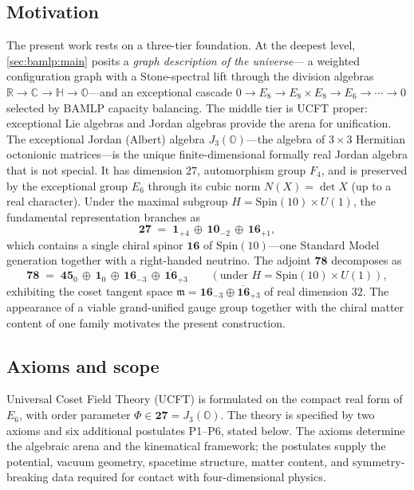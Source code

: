 \documentclass[11pt]{article}
\theoremstyle{plain}
\theoremstyle{definition}
\theoremstyle{remark}
\begin{document}
\subsection{Motivation}
\label{sec:intro:motivation}

The present work rests on a three-tier foundation. At the deepest level,
\autoref{sec:bamlp:main} posits a \emph{graph description of the universe}---
a weighted configuration graph with a Stone-spectral lift through the division
algebras $\mathbb{R}\to\mathbb{C}\to\mathbb{H}\to\mathbb{O}$---and an
exceptional cascade $0\to E_8\to E_8\times E_8\to E_6\to\cdots\to 0$ selected
by BAMLP capacity balancing. The middle tier is UCFT proper: exceptional Lie
algebras and Jordan algebras provide the arena for unification. The exceptional Jordan (Albert) algebra
$J_{3}(\mathbb{O})$---the algebra of $3\times 3$ Hermitian octonionic
matrices---is the unique finite-dimensional formally real Jordan algebra that is
not special. It has dimension $27$, automorphism group $F_4$, and is preserved
by the exceptional group $E_6$ through its cubic norm $N(X)=\det X$ (up to a
real character). Under the maximal subgroup $H=\mathrm{Spin}(10)\times U(1)$,
the fundamental representation branches as
\begin{equation}
  \mathbf{27} \;=\; \mathbf{1}_{+4}\,\oplus\,\mathbf{10}_{-2}\,\oplus\,\mathbf{16}_{+1},
  \label{eq:intro:27branch}
\end{equation}
which contains a single chiral spinor $\mathbf{16}$ of $\mathrm{Spin}(10)$---one
Standard Model generation together with a right-handed neutrino. The adjoint
$\mathbf{78}$ decomposes as
\begin{equation}
  \mathbf{78} \;=\; \mathbf{45}_{0}\,\oplus\,\mathbf{1}_{0}\,\oplus\,
  \mathbf{16}_{-3}\,\oplus\,\overline{\mathbf{16}}_{+3}
  \qquad (\text{under } H=\mathrm{Spin}(10)\times U(1)),
  \label{eq:intro:78branch}
\end{equation}
exhibiting the coset tangent space $\mathfrak{m}=\mathbf{16}_{-3}\oplus\overline{\mathbf{16}}_{+3}$
of real dimension $32$. The appearance of a viable grand-unified gauge group
together with the chiral matter content of one family motivates the present
construction.

\subsection{Axioms and scope}
\label{sec:intro:axioms}

Universal Coset Field Theory (UCFT) is formulated on the compact real form of
$E_6$, with order parameter $\Phi\in\mathbf{27}=J_3(\mathbb{O})$. The theory is
specified by two axioms and six additional postulates \textnormal{P1--P6}, stated
below. The axioms determine the algebraic arena and the kinematical framework;
the postulates supply the potential, vacuum geometry, spacetime structure,
matter content, and symmetry-breaking data required for contact with four-dimensional
physics.
\end{document}
